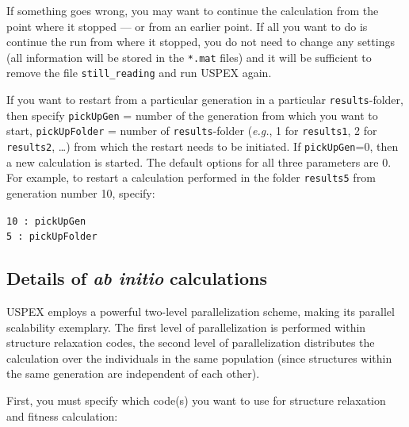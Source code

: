 \documentclass[12pt]{article}
\newcommand{\keyword}[1]{\texttt{#1}}
\newcommand{\file}[1]{\texttt{#1}}
\newcommand{\textshift}[1]{{\addtolength{\leftskip}{10mm}\texttt{{#1}}\par}}
\begin{document}
If something goes wrong, you may want to continue the calculation from the point
where it stopped --- or from an earlier point. If all you want to do is
continue the run from where it stopped, you do not need to change any settings
(all information will be stored in the \file{*.mat} files) and it will be
sufficient to remove the file \file{still\_reading} and run USPEX again.

If you want to restart from a particular generation in a particular
\file{results}-folder, then specify \keyword{pickUpGen} = number of the
generation from which you want to start, \file{pickUpFolder} = number of
\file{results}-folder (\emph{e.g.}, 1 for \file{results1}, 2 for
\file{results2}, \ldots) from which the restart needs to be initiated. If
\keyword{pickUpGen}=0, then a new calculation is started. The default options
for all three parameters are 0. For example, to restart a calculation performed
in the folder \file{results5} from generation number 10, specify:

\textshift{10    : pickUpGen \\
5     : pickUpFolder \\ 
}



\subsection{Details of \emph{ab initio} calculations}

USPEX employs a powerful two-level parallelization scheme, making its parallel
scalability exemplary. The first level of parallelization is performed within
structure relaxation codes, the second level of parallelization distributes the
calculation over the individuals in the same population (since structures within
the same generation are independent of each other).

First, you must specify which code(s) you want to use for structure relaxation
and fitness calculation:
\end{document}
